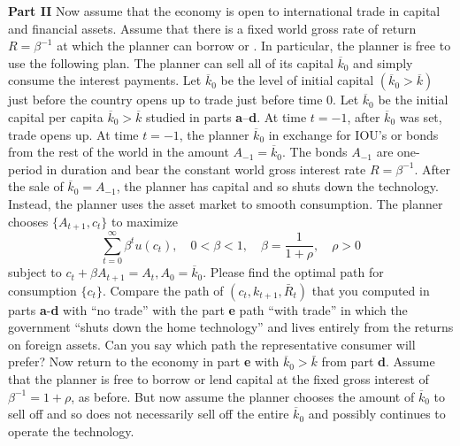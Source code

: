 \medskip\noindent
{\bf Part  II}
\medskip
{} Now assume that the economy is open to international trade in capital and financial assets. Assume that there is a fixed world gross rate of return $R=\beta^{-1}$ at which the planner can borrow or .
In particular, the planner is free to use the following plan. The planner can sell all of its capital $\overline{k}_0$ and simply consume the interest payments.
\noindent
Let $\overline{k}_0$ be the level of initial capital $(\overline{k}_0>\overline{k})$ just before the country opens up to trade just before time 0.  Let $\overline{k}_0$ be the initial capital per capita $\overline{k}_0 >\overline{k}$ studied in parts {\bf a}--{\bf d}.
At time $t=-1$, after $\overline{k}_0$ was set, trade opens up. At time $t=-1$, the planner  $\overline{k}_0$ in exchange for IOU's or bonds from the rest of the world in the amount $A_{-1}=\overline{k}_0$.
\medskip \noindent
The bonds $A_{-1}$ are one-period in duration and bear the constant world gross interest rate $R=\beta^{-1}$.
After the sale of $\overline{k}_0=A_{-1}$, the planner has  capital and so shuts down the technology. Instead, the planner uses the asset market to smooth consumption. The planner chooses $\{A_{t+1},c_t\}$ to maximize
$$ \sum_{t=0}^\infty \beta^t u(c_t),  \quad   0< \beta<1,\quad   \beta = {\frac{1}{1+\rho}},  \quad \rho>0$$
subject to
$c_t+\beta A_{t+1}=A_t,  A_0 = \overline{k}_0 .$
Please find the optimal path for consumption $\{c_t\}$.
%
\medskip
{} Compare the path of $(c_t,k_{t+1},\bar R_t)$ that you computed in parts {\bf a}-{\bf d} with ``no trade'' with the part {\bf e} path ``with trade'' in which the government ``shuts down the home technology'' and lives entirely from the returns on foreign assets. Can you say which path the representative consumer will prefer?
\medskip
{} Now return to the economy in part {\bf e} with $\overline{k}_0>\bar k$ from part {\bf d}.  Assume that the planner is free to borrow or lend capital at the fixed gross interest of $\beta^{-1}=1+\rho$, as before. But now assume the planner chooses the  amount of $\overline{k}_0$ to sell off and so does not necessarily sell off the entire $\overline{k}_0$ and possibly continues to operate the technology.

